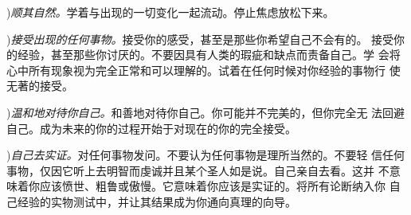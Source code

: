 ){\it 顺其自然。}学着与出现的一切变化一起流动。停止焦虑放松下来。


){\it 接受出现的任何事物。}接受你的感受，甚至是那些\1你希望自己不会有的。
接受你的经验，甚至那些你讨厌的。不要因具有人类的瑕疵和缺点而责备自己。学
会将心中所有现象视为完全正常和可以理解的。试着在任何时候对你经验的事物行
使无著的接受。

){\it 温和地对待你自己。}和善地对待你自己。你可能并不完美的，但你完全无
法回避自己。成为未来的你的过程开始于对现在的你的完全接受。

){\it 自己去实证。}对任何事物发问。不要认为任何事物是理所当然的。不要轻
信任何事物，仅因它听上去明智而虔诚并且某个圣人如是说。自己亲自去看。这并
不意味着你应该愤世、粗鲁或傲慢。它意味着你应该是实证的。将所有论断纳入你
自己经验的实物测试中，并让其结果成为你通向真理的向导。

\endchapter

\byebye
